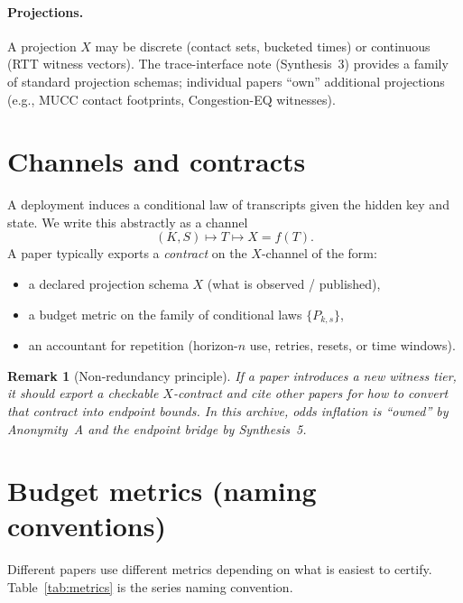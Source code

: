 \documentclass[11pt]{article}
\newtheorem{remark}{Remark}
\begin{document}
\paragraph{Projections.}
A projection $X$ may be discrete (contact sets, bucketed times) or continuous (RTT witness vectors).
The trace-interface note (Synthesis~3) provides a family of standard projection schemas; individual papers ``own'' additional projections (e.g., MUCC contact footprints, Congestion-EQ witnesses).\cite{series:traceifaces,series:state2,series:congeq}

\section{Channels and contracts}
A deployment induces a conditional law of transcripts given the hidden key and state.
We write this abstractly as a channel
\[
(K,S) \mapsto T \mapsto X=f(T).
\]
A paper typically exports a \emph{contract} on the $X$-channel of the form:
\begin{itemize}[leftmargin=1.2em]
\item a declared projection schema $X$ (what is observed / published),
\item a budget metric on the family of conditional laws $\{P_{k,s}\}$,
\item an accountant for repetition (horizon-$n$ use, retries, resets, or time windows).
\end{itemize}

\begin{remark}[Non-redundancy principle]
If a paper introduces a new witness tier, it should export a checkable $X$-contract and cite other papers for how to convert that contract into endpoint bounds.
In this archive, odds inflation is ``owned'' by Anonymity~A and the endpoint bridge by Synthesis~5.\cite{series:oddsinflation,series:endpointbridge}
\end{remark}

\section{Budget metrics (naming conventions)}
Different papers use different metrics depending on what is easiest to certify.
Table~\ref{tab:metrics} is the series naming convention.
\end{document}
